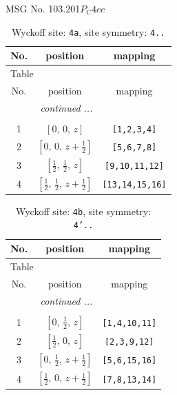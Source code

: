 \documentclass[fleqn,8pt]{jsarticle}
\begin{document}
\setcounter{MaxMatrixCols}{32}

\renewcommand{\tablename}{Table~}
\renewcommand{\figurename}{Figure~}
\begin{center}
\LARGE
MSG No. 103.201\quad$P_{C}4cc$
\end{center}
\renewcommand{\arraystretch}{1.2}
\begin{longtable}{ccc}
\caption{Wyckoff site: {\tt 4a}, site symmetry: {\tt 4..}}
 \\
 \hline \hline
No. & position & mapping \\ \hline \endfirsthead

\multicolumn{2}{l}{\tablename\ \thetable{}} \\
 \hline \hline
No. & position & mapping \\ \hline \endhead

 \hline \hline
\multicolumn{2}{r}{\footnotesize\it continued ...} \\ \endfoot

 \hline \hline
\multicolumn{2}{r}{} \\ \endlastfoot

1 & $\left[ 0,\, 0,\, z \right]$ & {\tt [1,2,3,4]} \\ \hline
2 & $\left[ 0,\, 0,\, z + \frac{1}{2} \right]$ & {\tt [5,6,7,8]} \\ \hline
3 & $\left[ \frac{1}{2},\, \frac{1}{2},\, z \right]$ & {\tt [9,10,11,12]} \\ \hline
4 & $\left[ \frac{1}{2},\, \frac{1}{2},\, z + \frac{1}{2} \right]$ & {\tt [13,14,15,16]} \\
\end{longtable}
\renewcommand{\arraystretch}{1.2}
\begin{longtable}{ccc}
\caption{Wyckoff site: {\tt 4b}, site symmetry: {\tt 4'..}}
 \\
 \hline \hline
No. & position & mapping \\ \hline \endfirsthead

\multicolumn{2}{l}{\tablename\ \thetable{}} \\
 \hline \hline
No. & position & mapping \\ \hline \endhead

 \hline \hline
\multicolumn{2}{r}{\footnotesize\it continued ...} \\ \endfoot

 \hline \hline
\multicolumn{2}{r}{} \\ \endlastfoot

1 & $\left[ 0,\, \frac{1}{2},\, z \right]$ & {\tt [1,4,10,11]} \\ \hline
2 & $\left[ \frac{1}{2},\, 0,\, z \right]$ & {\tt [2,3,9,12]} \\ \hline
3 & $\left[ 0,\, \frac{1}{2},\, z + \frac{1}{2} \right]$ & {\tt [5,6,15,16]} \\ \hline
4 & $\left[ \frac{1}{2},\, 0,\, z + \frac{1}{2} \right]$ & {\tt [7,8,13,14]} \\
\end{longtable}
\end{document}
